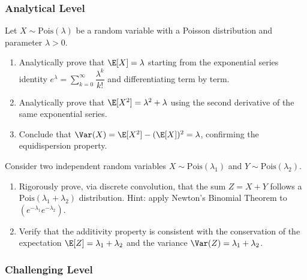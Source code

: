 \subsubsection*{Analytical Level}

\begin{problema}
	\label{prob:3.7.7}
	Let $X \sim \text{Pois}(\lambda)$ be a random variable with a Poisson distribution and parameter $\lambda > 0$.
	\begin{enumerate}
		\item Analytically prove that $\E[X] = \lambda$ starting from the exponential series identity $e^{\lambda} = \sum_{k=0}^{\infty} \dfrac{\lambda^{k}}{k!}$ and differentiating term by term.
		\item Analytically prove that $\E[X^{2}] = \lambda^{2} + \lambda$ using the second derivative of the same exponential series.
		\item Conclude that $\Var(X) = \E[X^{2}] - (\E[X])^{2} = \lambda$, confirming the equidispersion property.
	\end{enumerate}
\end{problema}

\begin{problema}
	\label{prob:3.7.8}
	Consider two independent random variables $X \sim \text{Pois}(\lambda_{1})$ and $Y \sim \text{Pois}(\lambda_{2})$.
	\begin{enumerate}
		\item Rigorously prove, via discrete convolution, that the sum $Z = X + Y$ follows a $\text{Pois}(\lambda_{1} + \lambda_{2})$ distribution. Hint: apply Newton's Binomial Theorem to $(e^{-\lambda_{1}} e^{-\lambda_{2}})$.
		\item Verify that the additivity property is consistent with the conservation of the expectation $\E[Z] = \lambda_{1} + \lambda_{2}$ and the variance $\Var(Z) = \lambda_{1} + \lambda_{2}$.
	\end{enumerate}
\end{problema}

\subsubsection*{Challenging Level}

